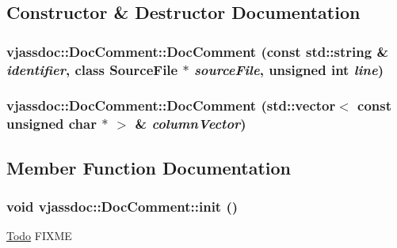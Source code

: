 \subsection{Constructor \& Destructor Documentation}
\hypertarget{classvjassdoc_1_1DocComment_1a3724cee4e159efbac83c6c6e163301}{
\subsubsection{\setlength{\rightskip}{0pt plus 5cm}vjassdoc::DocComment::DocComment (const std::string \& {\em identifier}, class {\bf SourceFile} $\ast$ {\em sourceFile}, unsigned int {\em line})}}
\label{classvjassdoc_1_1DocComment_1a3724cee4e159efbac83c6c6e163301}


\hypertarget{classvjassdoc_1_1DocComment_cc620c22e37f63571e20991a8f077ea3}{
\subsubsection{\setlength{\rightskip}{0pt plus 5cm}vjassdoc::DocComment::DocComment (std::vector$<$ const unsigned char $\ast$ $>$ \& {\em columnVector})}}
\label{classvjassdoc_1_1DocComment_cc620c22e37f63571e20991a8f077ea3}




\subsection{Member Function Documentation}
\hypertarget{classvjassdoc_1_1DocComment_46ada773166611c9be898f74e0eb2315}{
\subsubsection{\setlength{\rightskip}{0pt plus 5cm}void vjassdoc::DocComment::init ()}}
\label{classvjassdoc_1_1DocComment_46ada773166611c9be898f74e0eb2315}


\begin{Desc}
\item[\hyperlink{todo__todo000001}{Todo}]FIXME \end{Desc}


